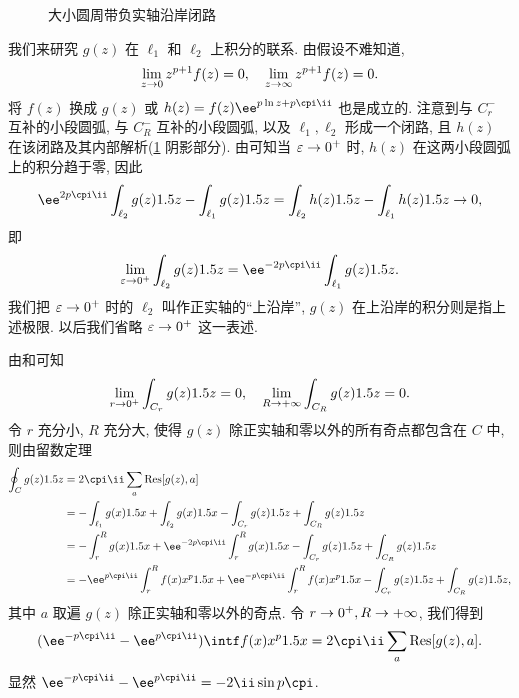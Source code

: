 \begin{figure}[!htb]
  \centering
  \caption{大小圆周带负实轴沿岸闭路}
  \label{fig:large-small-circle-negative-side}
\end{figure}

我们来研究 $g(z)$ 在 $\ell_1$ 和 $\ell_2$ 上积分的联系.
由假设不难知道,
\[
  \lim_{z\rightarrow 0} z^{p+1}f(z)=0,\quad
  \lim_{z\rightarrow \infty} z^{p+1}f(z)=0.
\]
将 $f(z)$ 换成 $g(z)$ 或 $h(z)=f(z)\ee^{p\ln z+p\cpi\ii}$ 也是成立的.
注意到与 $C_r^-$ 互补的小段圆弧, 与 $C_R^-$ 互补的小段圆弧, 以及 $\ell_1,\ell_2$ 形成一个闭路, 且 $h(z)$ 在该闭路及其内部解析(\ref{fig:large-small-circle-negative-side} 阴影部分).
由\thmsa 可知当 $\varepsilon\rightarrow0^+$ 时, $h(z)$ 在这两小段圆弧上的积分趋于零, 因此
\[
  \ee^{2p\cpi\ii}\int_{\ell_2} g(z)\d z-\int_{\ell_1} g(z)\d z
  =\int_{\ell_2} h(z)\d z-\int_{\ell_1} h(z)\d z
  \ra 0,
\]
即
\[
  \lim_{\varepsilon\ra 0^+}\int_{\ell_2} g(z)\d z
  =\ee^{-2p\cpi\ii}\int_{\ell_1} g(z)\d z.
\]
我们把 $\varepsilon\rightarrow 0^+$ 时的 $\ell_2$ 叫作正实轴的``上沿岸'', $g(z)$ 在上沿岸的积分则是指上述极限.
以后我们省略 $\varepsilon\rightarrow 0^+$ 这一表述.

由\thmsa 和\thmSA 可知
\[
  \lim_{r\rightarrow0^+}\int_{C_r} g(z)1.5 z=0,\quad
  \lim_{R\rightarrow+\infty}\int_{C_R} g(z)1.5 z=0.
\]
令 $r$ 充分小, $R$ 充分大, 使得 $g(z)$ 除正实轴和零以外的所有奇点都包含在 $C$ 中, 则由留数定理
\begin{align*}
   \oint_C g(z)\d z&
  =2\cpi\ii\sum_a \Res[g(z),a]\\&
  =-\int_{\ell_1} g(x)\d x
    +\int_{\ell_2} g(x)\d x
    -\int_{C_r}g(z)\d z
    +\int_{C_R}g(z)\d z\\&
  =-\int_r^R g(x)\d x
    +\ee^{-2p\cpi\ii}\int_r^R g(x)\d x
    -\int_{C_r}g(z)\d z
    +\int_{C_R}g(z)\d z\\&
  =-\ee^{p\cpi\ii}\int_r^R f(x)x^p\d x
    +\ee^{-p\cpi\ii}\int_r^R f(x)x^p\d x
    -\int_{C_r}g(z)\d z
    +\int_{C_R}g(z)\d z,
\end{align*}
其中 $a$ 取遍 $g(z)$ 除正实轴和零以外的奇点.
令 $r\rightarrow0^+,R\rightarrow +\infty$, 我们得到
\[
   (\ee^{-p\cpi\ii}-\ee^{p\cpi\ii})\intf f(x)x^p\d x
  =2\cpi\ii\sum_a \Res[g(z),a].
\]
显然 $\ee^{-p\cpi\ii}-\ee^{p\cpi\ii}=-2\ii\sin{p\cpi}$.

